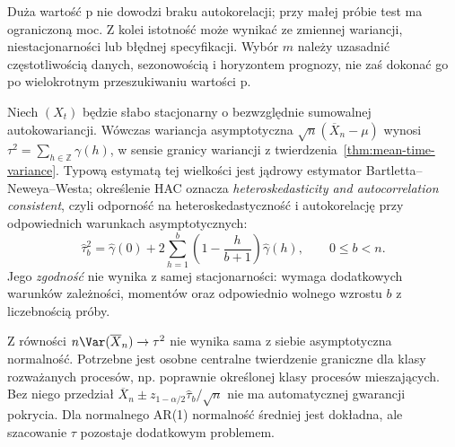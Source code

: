 \begin{uwaga}
Duża wartość p nie dowodzi braku autokorelacji;
przy małej próbie test ma ograniczoną moc.
Z kolei istotność może wynikać ze zmiennej
wariancji, niestacjonarności lub błędnej specyfikacji.
Wybór $m$ należy uzasadnić częstotliwością danych,
sezonowością i horyzontem prognozy, nie zaś dokonać
go po wielokrotnym przeszukiwaniu wartości p.
\end{uwaga}

\begin{stwierdzenie}
\label{prop:hac}
Niech $(X_t)$ będzie słabo stacjonarny o bezwzględnie
sumowalnej autokowariancji. Wówczas wariancja
asymptotyczna $\sqrt n(\overline X_n-\mu)$ wynosi
$\tau^2=\sum_{h\in\mathbb Z}\gamma(h)$, w sensie
granicy wariancji z twierdzenia~\ref{thm:mean-time-variance}.
Typową estymatą tej wielkości jest jądrowy estymator
Bartletta--Neweya--Westa; określenie HAC oznacza
\emph{heteroskedasticity and autocorrelation consistent},
czyli odporność na heteroskedastyczność i autokorelację
przy odpowiednich warunkach asymptotycznych:
\[
 \widehat\tau^2_b=\widehat\gamma(0)+
 2\sum_{h=1}^{b}\left(1-\frac{h}{b+1}\right)
 \widehat\gamma(h),\qquad 0\le b<n.
\]
Jego \emph{zgodność} nie wynika z samej stacjonarności:
wymaga dodatkowych warunków zależności, momentów oraz
odpowiednio wolnego wzrostu $b$ z liczebnością próby.
\end{stwierdzenie}

\begin{uwaga}
Z równości $n\Var(\overline X_n)\to\tau^2$
nie wynika sama z siebie asymptotyczna normalność.
Potrzebne jest osobne centralne twierdzenie graniczne
dla klasy rozważanych procesów, np. poprawnie określonej
klasy procesów mieszających. Bez niego przedział
$\overline X_n\pm z_{1-\alpha/2}\widehat\tau_b/\sqrt n$
nie ma automatycznej gwarancji pokrycia. Dla
normalnego AR(1) normalność średniej jest dokładna,
ale szacowanie $\tau$ pozostaje dodatkowym problemem.
\end{uwaga}


